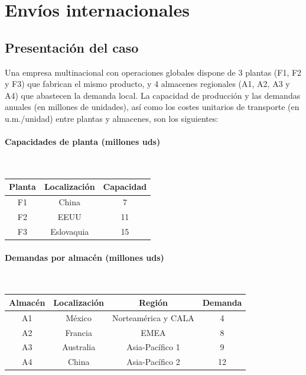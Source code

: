 \section{Envíos internacionales}



\subsection{Presentación del caso}
Una empresa multinacional con operaciones globales dispone de 3 plantas (F1, F2 y F3) que fabrican el mismo producto, y 4 almacenes regionales (A1, A2, A3 y A4) que abastecen la demanda local. La capacidad de producción y las demandas anuales (en millones de unidades), así como los costes unitarios de transporte (en u.m./unidad) entre plantas y almacenes, son los siguientes:

\paragraph{Capacidades de planta (millones uds)}\mbox{}\\
\begin{tabular}{c c c}
\hline
\textbf{Planta} & \textbf{Localización} & \textbf{Capacidad} \\
\hline
F1 & China       & 7  \\
F2 & EEUU        & 11 \\
F3 & Eslovaquia  & 15 \\
\hline
\end{tabular}

\vspace{0.6em}
\paragraph{Demandas por almacén (millones uds)}\mbox{}\\
\begin{tabular}{c c c c}
\hline
\textbf{Almacén} & \textbf{Localización} & \textbf{Región} & \textbf{Demanda} \\
\hline
A1 & México    & Norteamérica y CALA & 4  \\
A2 & Francia   & EMEA                 & 8  \\
A3 & Australia & Asia-Pacífico 1      & 9  \\
A4 & China     & Asia-Pacífico 2      & 12 \\
\hline
\end{tabular}

